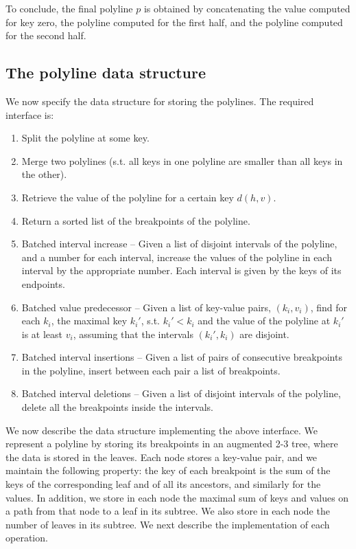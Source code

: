 \documentclass[a4paper,UKenglish]{lipics-v2016}
\theoremstyle{plain}
\begin{document}
To conclude, the final polyline $p$ is obtained by concatenating the value computed for key zero, the polyline computed for the first half, and the polyline computed for the second half. 


\subsection{The polyline data structure} We now specify the data structure for storing the polylines. The required interface is:
\begin{enumerate}
\item \label{op1} Split the polyline at some key.
\item \label{op2} Merge two polylines (s.t. all  keys in one polyline are smaller than all keys in the other).
\item \label{op3} Retrieve the value of the polyline for a certain key $d(h,v)$.
\item \label{op4}Return a sorted list of the breakpoints of the polyline.
\item \label{op5} Batched interval increase -- Given a list of disjoint intervals of the polyline, and a number for each interval, increase the values of the polyline in each interval by the appropriate number. Each interval is given by the keys of its endpoints.
\item \label{op6} Batched value predecessor -- Given a list of key-value pairs, $(k_i,v_i)$, find for each $k_i$, the maximal key $k_{i}'$, s.t. $k_{i}' < k_i$ and the value of the polyline at $k_{i}'$ is at least $v_i$, assuming that the intervals $(k_{i}',k_{i})$ are disjoint.
\item \label{op7} Batched interval insertions -- Given a list of pairs of consecutive breakpoints in the polyline, insert between each pair a list of breakpoints.
\item \label{op8} Batched interval deletions -- Given a list of disjoint intervals of the polyline, delete all the breakpoints inside the intervals.
\end{enumerate}
We now describe the data structure implementing the above interface. We represent a polyline by storing its breakpoints in an augmented 2-3 tree, where the data is stored in the leaves. Each node stores a key-value pair, and we maintain the following property: the key of each breakpoint is the sum of the keys of the corresponding leaf and of all its ancestors, and similarly for the values. In addition, we store in each node the maximal sum of keys and values on a path from that node to a leaf in its subtree. We also store in each node the number of leaves in its subtree. We next describe the implementation of each operation.
\end{document}
